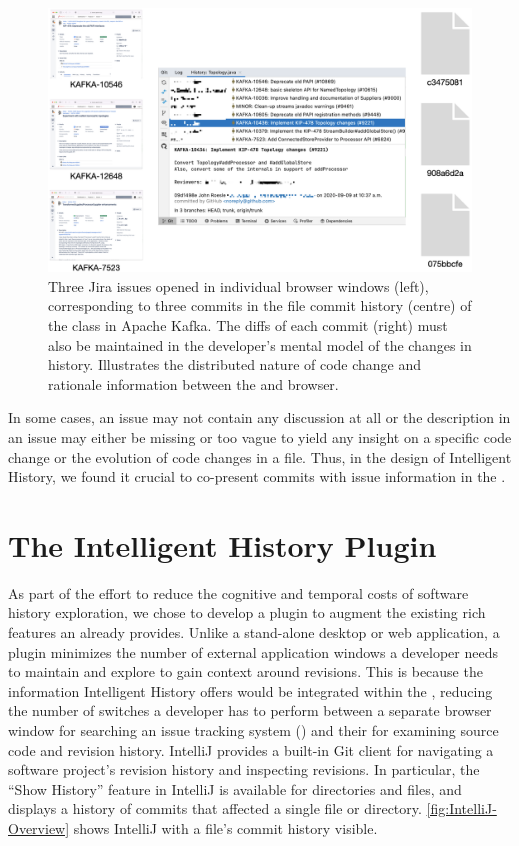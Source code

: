 \begin{figure}
    \center
    \includegraphics[width=\textwidth]{./images/cognitive-load.png}
    \caption{
        Three Jira issues opened in individual browser windows (left), corresponding to three commits in the file commit history (centre) of the  class in Apache Kafka. 
        The diffs of each commit (right) must also be maintained in the developer's mental model of the changes in history. 
        Illustrates the distributed nature of code change and rationale information between the  and browser.
    }
    \label{fig:Cognitive-Load}
\end{figure}

In some cases, an issue may not contain any discussion at all or the description in an issue may either be missing or too vague to yield any insight on a specific code change or the evolution of code changes in a file.
Thus, in the design of Intelligent History, we found it crucial to co-present commits with issue information in the .

\section{The Intelligent History Plugin}
\label{sec:Implementation}

As part of the effort to reduce the cognitive and temporal costs of software history exploration, 
we chose to develop a plugin to augment the existing rich features an  already provides.
Unlike a stand-alone desktop or web application, a plugin minimizes the number of external application windows a developer needs to maintain and explore to gain context around revisions. 
This is because the information Intelligent History offers would be integrated within the , 
reducing the number of switches a developer has to perform between a separate browser window for searching an issue tracking system ()
and their  for examining source code and revision history.
IntelliJ provides a built-in Git client  for navigating a software project's revision history and inspecting revisions. 
In particular, the ``Show History'' feature in IntelliJ is available for directories and files, 
and displays a history of commits that affected a single file or directory.
\autoref{fig:IntelliJ-Overview} shows IntelliJ with a file's commit history visible.

